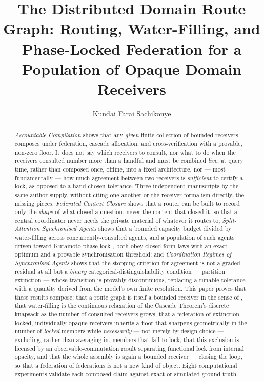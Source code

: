 \documentclass[11pt,twocolumn,a4paper]{article}
\title{\textbf{The Distributed Domain Route Graph: Routing, Water-Filling,
and Phase-Locked Federation for a Population of Opaque Domain Receivers}}
\author{Kundai Farai Sachikonye}
\date{}
\theoremstyle{rdm}
\theoremstyle{definition}
\theoremstyle{remark}
\begin{document}
\maketitle

\begin{abstract}
\emph{Accountable Compilation} \citep{sachikonye-accountable-compilation}
shows that any \emph{given} finite collection of bounded receivers composes
under federation, cascade allocation, and cross-verification with a
provable, non-zero floor. It does not say which receivers to consult, nor
what to do when the receivers consulted number more than a handful and must
be combined \emph{live}, at query time, rather than composed once, offline,
into a fixed architecture, nor — most fundamentally — how much agreement
between two receivers is \emph{sufficient} to certify a lock, as opposed to
a hand-chosen tolerance. Three independent manuscripts by the same author
supply, without citing one another or the receiver formalism directly,
the missing pieces: \emph{Federated Context Closure}
\citep{sachikonye-federated-context-closure} shows that a router can be
built to record only the \emph{shape} of what closed a question, never the
content that closed it, so that a central coordinator never needs the
private material of whatever it routes to; \emph{Split-Attention
Synchronised Agents} \citep{sachikonye-split-attention} shows that a bounded
capacity budget divided by water-filling across concurrently-consulted
agents, and a population of such agents driven toward Kuramoto phase-lock
\citep{kuramoto1975}, both obey closed-form laws with an exact optimum and a
provable synchronisation threshold; and \emph{Coordination Regimes of
Synchronised Agents} \citep{sachikonye-coordination-regimes} shows that the
stopping criterion for agreement is not a graded residual at all but a
\emph{binary} categorical-distinguishability condition — partition
extinction — whose transition is provably discontinuous, replacing a
tunable tolerance with a quantity derived from the model's own finite
resolution. This paper proves that these results compose: that a route
graph is itself a bounded receiver in the sense of
\citet{sachikonye-accountable-compilation}, that water-filling is the
continuous relaxation of the Cascade Theorem's discrete knapsack as the
number of consulted receivers grows, that a federation of
extinction-locked, individually-opaque receivers inherits a floor that
sharpens geometrically in the number of \emph{locked} members while
\emph{necessarily} — not merely by design choice — excluding, rather than
averaging in, members that fail to lock, that this exclusion is licensed by
an observable-commutation result separating functional lock from internal
opacity, and that the whole assembly is again a bounded receiver — closing
the loop, so that a federation of federations is not a new kind of object.
Eight computational experiments validate each composed claim against exact
or simulated ground truth.
\end{abstract}
\end{document}
